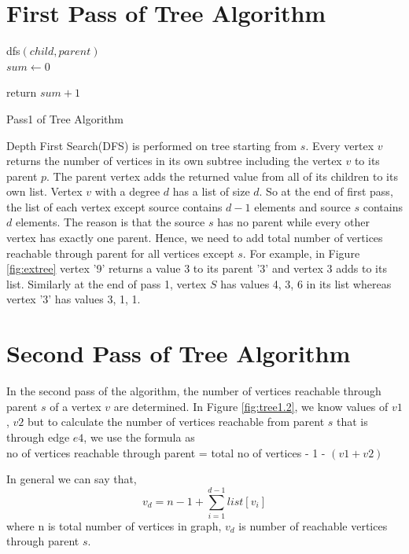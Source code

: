 \section{First Pass of Tree Algorithm}
\begin{algorithm}
dfs$(child, parent)$ \\
$sum \leftarrow 0$\;

return $sum + 1$\;
\caption{Pass1 of Tree Algorithm}
\label{treeealgo}
\end{algorithm}
Depth First Search(DFS) is performed on tree starting from $s$. Every vertex $v$ returns the number of vertices in its own subtree including the vertex $v$ to its parent $p$. The parent vertex adds the returned value from all of its children to its own list.
Vertex $v$ with a degree $d$ has a list of size $d$.
So at the end of first pass, the list of each vertex except source contains $d-1$ elements and source $s$ contains $d$ elements. The reason is that the source $s$ has no parent while every other vertex has exactly one parent. Hence, we need to add total number of vertices reachable through parent for all vertices except $s$.
For example, in Figure \ref{fig:extree} vertex '9' returns a value 3 to its parent '3' and vertex 3 adds to its list. Similarly at the end of pass 1, vertex $S$ has values 4, 3, 6 in its list whereas vertex '3' has values 3, 1, 1. 
\vspace{-1.0em}
\section{Second Pass of Tree Algorithm}
\vspace{-1.0em}
In the second pass of the algorithm, the number of vertices reachable through parent $s$ of a vertex $v$ are determined.
In Figure \ref{fig:tree1.2}, we know values of $v1$, $v2$ but to calculate the number of vertices reachable from parent $s$ that is through edge $e4$, we use the formula as
\\
no of vertices reachable through parent = total no of vertices - 1 - $(v1 + v2)$

In general we can say that,
\begin{equation} \label{eq5}
v_{d} = n - 1 + \sum_{i=1}^{d-1} list[v_{i}]
\end{equation}
where n is total number of vertices in graph, $v_{d}$ is number of reachable vertices through parent $s$.

